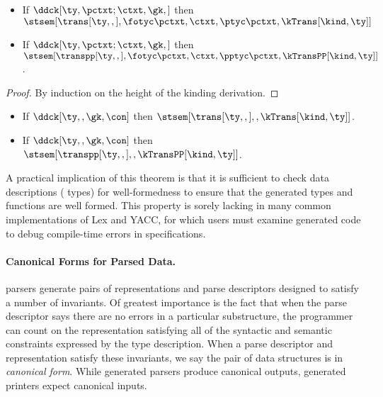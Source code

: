 \begin{lemma}
\label{thm:type-correctness}
\begin{itemize}
\item If $\ddck[\ty,{\pctxt;\ctxt},\gk,{}]$ then
  $\stsem[{\trans[\ty,,]},{\fotyc \pctxt, \ctxt,\ptyc \pctxt},
            {\kTrans[\kind,\ty]}]$
\item If $\ddck[\ty,{\pctxt;\ctxt},\gk,{}]$ then
  $\stsem[{\transpp[\ty,,]},{\fotyc \pctxt, \ctxt,\pptyc \pctxt},
            {\kTransPP[\kind,\ty]}]$.
\end{itemize}  
\end{lemma}

\begin{proof}
  By induction on the height of the kinding derivation.
\end{proof}

\begin{theorem}
  \begin{itemize}
  \item If $\ddck[\ty,,\gk,\con]$ then
    $\stsem[{\trans[\ty,,]},,\kTrans[\kind,\ty]]$.
  \item If $\ddck[\ty,,\gk,\con]$ then
    $\stsem[{\transpp[\ty,,]},,\kTransPP[\kind,\ty]]$.
  \end{itemize}  
\end{theorem}

A practical implication of this theorem is that
it is sufficient to check data descriptions (\ie{} \ddc{} types) for
well-formedness to ensure that the generated types and
functions are well formed. This property is sorely lacking in many
common implementations of Lex and YACC, for which users must examine
generated code to debug compile-time errors in
specifications.

\paragraph*{Canonical Forms for Parsed Data.}
\ddc{} parsers generate pairs of representations and parse descriptors
designed to satisfy a number of invariants.  Of greatest importance is 
the fact that
when the parse descriptor says there are no errors in a particular
substructure, the programmer can count on the representation
satisfying all of the syntactic and semantic
constraints expressed by the 
\ddc{} type description.  When a parse descriptor and representation
satisfy these invariants, we say the pair
of data structures is in {\em canonical form}.
While generated parsers produce canonical outputs, generated printers
expect canonical inputs.  


